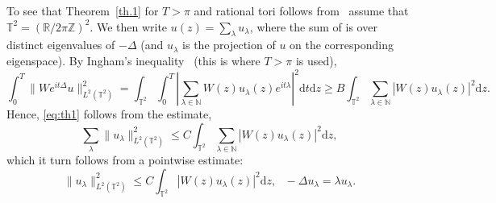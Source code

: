 \documentclass[10pt]{amsart}
\theoremstyle{definition}\newtheorem{defi}[theo]{Definition}\newtheorem{rema}[theo]{Remark}\newtheorem{exam}[theo]{Example}\newtheorem{exem}[theo]{Example}\newtheorem{nota}[theo]{Notation}
\newcommand{\NN}{{\mathbb N}}
\newcommand{\R}{{\mathbb R}}
\newcommand{\TT}{{\mathbb T}}
\newcommand{\ZZ}{{\mathbb Z}}
\newcommand*{\dd}{\mathrm{d}}
\newcommand*{\dz}{\dd z}
\newcommand*{\dt}{\dd t}
\begin{document}
To see that Theorem~\ref{th.1} for $ T > \pi $ and rational tori follows from~\cite[Theorem~1.2]{Jak} assume that $ \TT^2 = (\R/2\pi \ZZ)^2 $. We then write $ u (z) = \sum_{ \lambda } u_\lambda $, where the sum of is over distinct eigenvalues of $ - \Delta $ (and $u_\lambda$ is the projection of $u$ on the corresponding eigenspace). By Ingham's inequality~\cite{ing} (this is where $ T > \pi $ is used),
\[
\int_0^T \| W e^{ it \Delta} u \|^2_{ L^2 (\TT^2)} =
\int_{\TT^2 } \int_0^T \left| \sum_{ \lambda \in \NN } W(z) u_\lambda (z) e^{i t \lambda } \right|^2 \dt \dz \geq B
\int_{\TT^2} \sum_{ \lambda \in \NN } | W (z) u_\lambda (z) |^2 \dz.
\]
Hence, \eqref{eq:th1} follows from the estimate,
\begin{equation}\label{eq:Jak}
\sum_{ \lambda } \| u_\lambda\|^2_{L^2 (\TT^2) } \leq C \int_{\TT^2} \sum_{ \lambda \in \NN } | W (z) u_\lambda (z) |^2 \dz,
\end{equation}
which it turn follows from a pointwise estimate:
\begin{equation}\label{eq:Jak1}
\| u_\lambda\|^2_{L^2 (\TT^2) } \leq C \int_{\TT^2} | W (z) u_\lambda (z) |^2 \dz, \ \ \ - \Delta u_\lambda = \lambda u_\lambda.
\end{equation}
\end{document}
